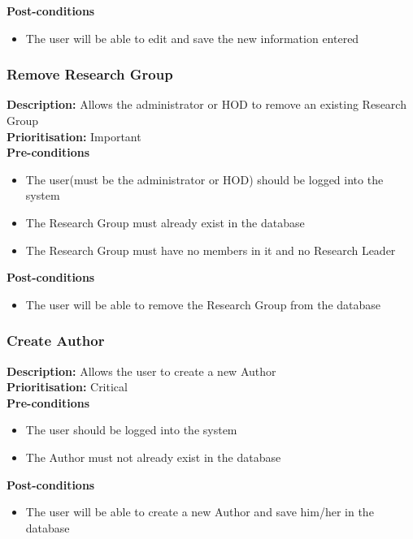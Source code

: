 \documentclass[a4paper]{article}
\begin{document}
	\textbf{Post-conditions}
	 \begin{itemize}
		\item The user will be able to edit and save the new information entered
	\end{itemize}
	
	\subsubsection{Remove Research Group}
	\textbf{Description:} Allows the administrator or HOD to remove an existing Research Group\\
	\textbf{Prioritisation:} Important\\
	
	\textbf{Pre-conditions}
	 \begin{itemize}
		\item The user(must be the administrator or HOD) should be logged into the system
		\item The Research Group must already exist in the database
		\item The Research Group must have no members in it and no Research Leader
	\end{itemize}
	
	\textbf{Post-conditions}
	 \begin{itemize}
		\item The user will be able to remove the Research Group from the database
	\end{itemize}
	
	\subsubsection{Create Author}
	\textbf{Description:} Allows the user to create a new Author\\
	\textbf{Prioritisation:} Critical\\
	
	\textbf{Pre-conditions}
	 \begin{itemize}
		\item The user should be logged into the system
		\item The Author must not already exist in the database
	\end{itemize}
	
	\textbf{Post-conditions}
	 \begin{itemize}
		\item The user will be able to create a new Author and save him/her in the database
	\end{itemize}
	
\end{document}
